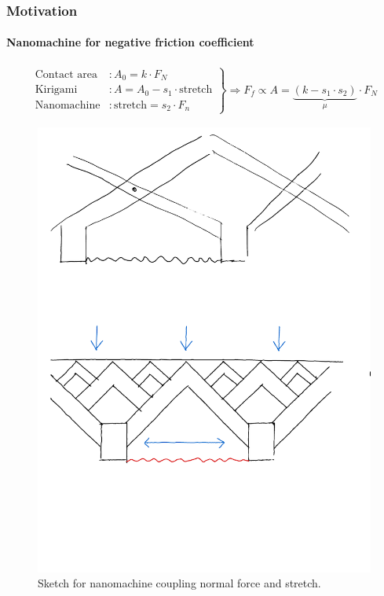 \documentclass[
	10pt, %
]{beamer}
\begin{document}
\begin{frame}
	\frametitle{Motivation}
	\framesubtitle{Nanomachine for negative friction coefficient}

	\begin{align*}
		\left.\begin{aligned}
			\text{Contact area} &: A_0 = k \cdot F_N \\
			\text{Kirigami} &: A = A_0 - s_1 \cdot \text{stretch} \\
			\text{Nanomachine}&: \text{stretch} = s_2 \cdot F_n
		  \end{aligned}\right\} \Longrightarrow F_f \propto A = \underbrace{(k - s_1 \cdot s_2)}_{\mu} \cdot F_N
	\end{align*}
	
	\begin{figure}
		\includegraphics[width=0.6\linewidth]{figures/nanomachine.pdf}
		\caption{Sketch for nanomachine coupling normal force and stretch.}
	\end{figure}	

	
\end{frame}
\end{document}
